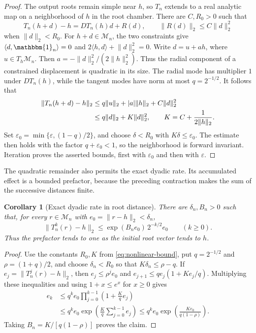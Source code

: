 \documentclass[12pt,reqno]{amsart}
\newtheorem{corollary}[corollary]{Corollary}
\theoremstyle{definition}
\theoremstyle{remark}
\newcommand{\one}{\mathbbm{1}_n}
\newcommand{\cM}{\mathcal M}
\newcommand{\eps}{\varepsilon}
\begin{document}
\begin{proof}
The output roots remain simple near \(h\), so \(T_n\) extends to a real
analytic map on a neighborhood of \(h\) in the root chamber.  There are
\(C,R_0>0\) such that
\begin{equation}\label{eq:T-taylor}
 T_n(h+d)-h=DT_n(h)d+R(d),
 \qquad \lVert R(d)\rVert_2\leq C\lVert d\rVert_2^2
\end{equation}
when \(\lVert d\rVert_2<R_0\).
For \(h+d\in\cM_n\), the two constraints give
\(\langle d,\one\rangle=0\) and
\(2\langle h,d\rangle+\lVert d\rVert_2^2=0\).
Write \(d=u+ah\), where \(u\in T_h\cM_n\).  Then
\(a=-\lVert d\rVert_2^2/(2\lVert h\rVert_2^2)\).
Thus the radial component of a constrained displacement is quadratic in
its size.  The radial mode has multiplier \(1\) under \(DT_n(h)\), while
the tangent modes have norm at most \(q=2^{-1/2}\).  It follows that
\begin{align}\label{eq:nonlinear-bound}
 \lVert T_n(h+d)-h\rVert_2
 &\leq q\lVert u\rVert_2+|a|\lVert h\rVert_2
       +C\lVert d\rVert_2^2\notag\\
 &\leq q\lVert d\rVert_2+K\lVert d\rVert_2^2,
 \qquad K=C+\frac1{2\lVert h\rVert_2}.
\end{align}
Set \(\eps_0=\min\{\eps,(1-q)/2\}\), and choose \(\delta<R_0\) with
\(K\delta\leq\eps_0\).  The estimate then holds with the factor
\(q+\eps_0<1\), so the neighborhood is forward invariant.  Iteration
proves the asserted bounds, first with \(\eps_0\) and then with \(\eps\).
\end{proof}

The quadratic remainder also permits the exact dyadic rate.  Its accumulated
effect is a bounded prefactor, because the preceding contraction makes the
sum of the successive distances finite.

\begin{corollary}[Exact dyadic rate in root distance]
\label{cor:exact-dyadic-root-rate}
There are \(\delta_n,B_n>0\) such that, for every \(r\in\cM_n\) with
\(e_0=\lVert r-h\rVert_2<\delta_n\),
\begin{equation}\label{eq:exact-dyadic-root-rate}
 \lVert T_n^k(r)-h\rVert_2
 \leq \exp(B_ne_0)\,2^{-k/2}e_0
 \qquad(k\geq0).
\end{equation}
Thus the prefactor tends to one as the initial root vector tends to \(h\).
\end{corollary}

\begin{proof}
Use the constants \(R_0,K\) from \eqref{eq:nonlinear-bound}, put
\(q=2^{-1/2}\) and \(\rho=(1+q)/2\), and choose \(\delta_n<R_0\) so
that \(K\delta_n\leq\rho-q\).  If
\(e_j=\lVert T_n^j(r)-h\rVert_2\), then \(e_j\leq\rho^je_0\) and
\(e_{j+1}\leq qe_j(1+Ke_j/q)\).  Multiplying these inequalities and
using \(1+x\leq e^x\) for \(x\geq0\) gives
\begin{align*}
 e_k
 &\leq q^ke_0\prod_{j=0}^{k-1}\left(1+\frac Kq e_j\right)\\
 &\leq q^ke_0\exp\!\left(\frac Kq\sum_{j=0}^{k-1}e_j\right)
 \leq q^ke_0\exp\!\left(\frac{K e_0}{q(1-\rho)}\right).
\end{align*}
Taking \(B_n=K/[q(1-\rho)]\) proves the claim.
\end{proof}
\end{document}
